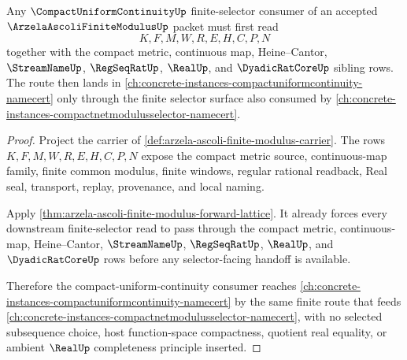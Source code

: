 \begin{theorem}
\label{thm:arzela-ascoli-finite-modulus-compact-uniform-repair}
Any $\CompactUniformContinuityUp$ finite-selector consumer of an accepted $\ArzelaAscoliFiniteModulusUp$ packet must first read
$$
K,F,M,W,R,E,H,C,P,N
$$
together with the compact metric, continuous map, Heine--Cantor, $\StreamNameUp$, $\RegSeqRatUp$, $\RealUp$, and $\DyadicRatCoreUp$ sibling rows. The route then lands in \autoref{ch:concrete-instances-compactuniformcontinuity-namecert} only through the finite selector surface also consumed by \autoref{ch:concrete-instances-compactnetmodulusselector-namecert}.
\end{theorem}
\begin{proof}
Project the carrier of \autoref{def:arzela-ascoli-finite-modulus-carrier}. The rows $K,F,M,W,R,E,H,C,P,N$ expose the compact metric source, continuous-map family, finite common modulus, finite windows, regular rational readback, Real seal, transport, replay, provenance, and local naming.

Apply \autoref{thm:arzela-ascoli-finite-modulus-forward-lattice}. It already forces every downstream finite-selector read to pass through the compact metric, continuous-map, Heine--Cantor, $\StreamNameUp$, $\RegSeqRatUp$, $\RealUp$, and $\DyadicRatCoreUp$ rows before any selector-facing handoff is available.

Therefore the compact-uniform-continuity consumer reaches \autoref{ch:concrete-instances-compactuniformcontinuity-namecert} by the same finite route that feeds \autoref{ch:concrete-instances-compactnetmodulusselector-namecert}, with no selected subsequence choice, host function-space compactness, quotient real equality, or ambient $\RealUp$ completeness principle inserted.
\end{proof}



